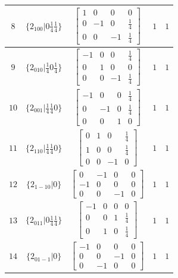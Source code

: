 \documentclass[fleqn,8pt]{jsarticle}
\begin{document}
\begin{longtable}{ccccc}
$ 8 $ & $ \{2{}_{100}|0 \frac{1}{4} \frac{1}{4}\} $ & $ \begin{bmatrix} 1 & 0 & 0 & 0 \\ 0 & -1 & 0 & \frac{1}{4} \\ 0 & 0 & -1 & \frac{1}{4} \end{bmatrix} $ & $ 1 $ & $ 1 $ \\ \hline
$ 9 $ & $ \{2{}_{010}|\frac{1}{4} 0 \frac{1}{4}\} $ & $ \begin{bmatrix} -1 & 0 & 0 & \frac{1}{4} \\ 0 & 1 & 0 & 0 \\ 0 & 0 & -1 & \frac{1}{4} \end{bmatrix} $ & $ 1 $ & $ 1 $ \\ \hline
$ 10 $ & $ \{2{}_{001}|\frac{1}{4} \frac{1}{4} 0\} $ & $ \begin{bmatrix} -1 & 0 & 0 & \frac{1}{4} \\ 0 & -1 & 0 & \frac{1}{4} \\ 0 & 0 & 1 & 0 \end{bmatrix} $ & $ 1 $ & $ 1 $ \\ \hline
$ 11 $ & $ \{2{}_{110}|\frac{1}{4} \frac{1}{4} 0\} $ & $ \begin{bmatrix} 0 & 1 & 0 & \frac{1}{4} \\ 1 & 0 & 0 & \frac{1}{4} \\ 0 & 0 & -1 & 0 \end{bmatrix} $ & $ 1 $ & $ 1 $ \\ \hline
$ 12 $ & $ \{2{}_{1-10}|0\} $ & $ \begin{bmatrix} 0 & -1 & 0 & 0 \\ -1 & 0 & 0 & 0 \\ 0 & 0 & -1 & 0 \end{bmatrix} $ & $ 1 $ & $ 1 $ \\ \hline
$ 13 $ & $ \{2{}_{011}|0 \frac{1}{4} \frac{1}{4}\} $ & $ \begin{bmatrix} -1 & 0 & 0 & 0 \\ 0 & 0 & 1 & \frac{1}{4} \\ 0 & 1 & 0 & \frac{1}{4} \end{bmatrix} $ & $ 1 $ & $ 1 $ \\ \hline
$ 14 $ & $ \{2{}_{01-1}|0\} $ & $ \begin{bmatrix} -1 & 0 & 0 & 0 \\ 0 & 0 & -1 & 0 \\ 0 & -1 & 0 & 0 \end{bmatrix} $ & $ 1 $ & $ 1 $ \\ \hline

\end{longtable}
\end{document}
